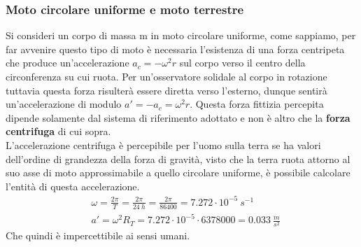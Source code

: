 \documentclass[10pt,a4paper]{article}
\begin{document}
\subsubsection*{Moto circolare uniforme e moto terrestre}
Si consideri un corpo di massa m in moto circolare uniforme, come sappiamo, per far avvenire questo tipo di moto è necessaria l'esistenza di una forza centripeta che produce un'accelerazione $a_c=-\omega^2r$ sul corpo verso il centro della circonferenza su cui ruota. Per un'osservatore solidale al corpo in rotazione tuttavia questa forza risulterà essere diretta verso l'esterno, dunque sentirà un'accelerazione di modulo $a'=-a_c=\omega^2r$. Questa forza fittizia percepita dipende solamente dal sistema di riferimento adottato e non è altro che la \textbf{forza centrifuga} di cui sopra.\\
L'accelerazione centrifuga è percepibile per l'uomo sulla terra se ha valori dell'ordine di grandezza della forza di gravità, visto che la terra ruota attorno al suo asse di moto approssimabile a quello circolare uniforme, è possibile calcolare l'entità di questa accelerazione. 
\begin{align*}
	&\omega = \frac{2\pi}{T}= \frac{2\pi}{24\ h} = \frac{2\pi}{86400}= 7.272\cdot 10^{-5}\ s^{-1}\\
	&a'=\omega^2 R_T=7.272\cdot 10^{-5}\cdot 6378000 = 0.033\ \frac{m}{s^2}
\end{align*}
Che quindi è impercettibile ai sensi umani. 
\end{document}
